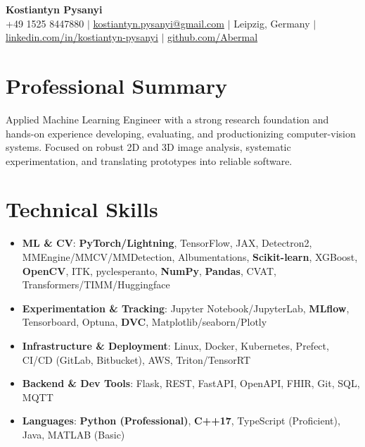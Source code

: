 \documentclass[letterpaper,10pt]{article}
\newcommand{\resumeItem}[1]{
    \item\small{#1}\vspace{-0.5pt}
}
\newcommand{\resumeSubHeadingList}{\begin{itemize}[leftmargin=0.15in, label={}]\vspace{-2pt}}
\newcommand{\resumeSubHeadingListEnd}{\end{itemize}}
\begin{document}
\begin{center}
  \textbf{\Huge Kostiantyn Pysanyi}\vspace{4pt} \\
  \small +49 1525 8447880 $|$ \href{mailto:kostiantyn.pysanyi@gmail.com}{kostiantyn.pysanyi@gmail.com} $|$ Leipzig, Germany $|$
  \href{https://www.linkedin.com/in/kostiantyn-pysanyi/}{linkedin.com/in/kostiantyn-pysanyi} $|$ \href{https://github.com/Abermal}{github.com/Abermal}
\end{center}


\section{Professional Summary}
Applied Machine Learning Engineer with a strong research foundation and hands-on experience developing, evaluating, and productionizing computer-vision systems. Focused on robust 2D and 3D image analysis, systematic experimentation, and translating prototypes into reliable software.

\section{Technical Skills}
\resumeSubHeadingList
  \resumeItem{\textbf{ML \& CV}: \textbf{PyTorch/Lightning}, TensorFlow, JAX, Detectron2, MMEngine/MMCV/MMDetection, Albumentations, \textbf{Scikit-learn}, XGBoost, \textbf{OpenCV}, ITK, pyclesperanto, \textbf{NumPy}, \textbf{Pandas}, CVAT, Transformers/TIMM/Huggingface}
  \resumeItem{\textbf{Experimentation \& Tracking}: Jupyter Notebook/JupyterLab, \textbf{MLflow}, Tensorboard, Optuna, \textbf{DVC}, Matplotlib/seaborn/Plotly}
  \resumeItem{\textbf{Infrastructure \& Deployment}: Linux, Docker, Kubernetes, Prefect, CI/CD (GitLab, Bitbucket), AWS, Triton/TensorRT}
  \resumeItem{\textbf{Backend \& Dev Tools}: Flask, REST, FastAPI, OpenAPI, FHIR, Git, SQL, MQTT}
  \resumeItem{\textbf{Languages}: \textbf{Python (Professional)}, \textbf{C++17}, TypeScript (Proficient), Java, MATLAB (Basic)}
\resumeSubHeadingListEnd
\end{document}
